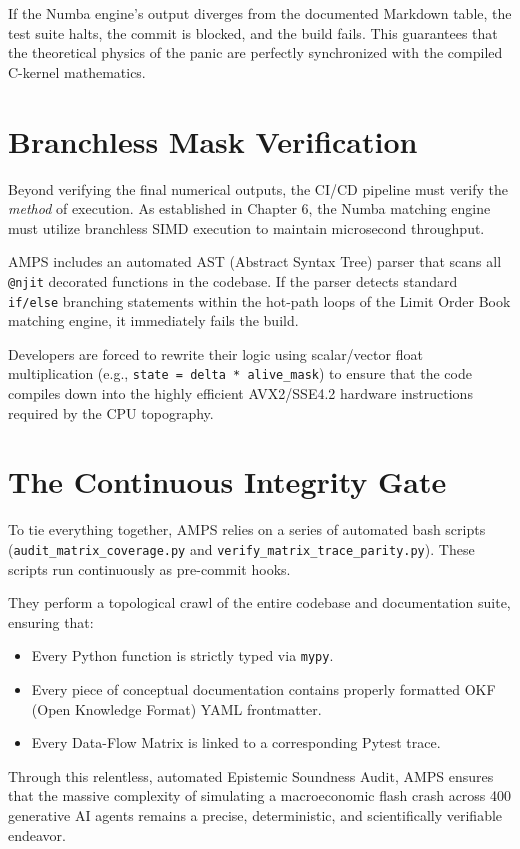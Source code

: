 If the Numba engine's output diverges from the documented Markdown table, the test suite halts, the commit is blocked, and the build fails. This guarantees that the theoretical physics of the panic are perfectly synchronized with the compiled C-kernel mathematics.

\section{Branchless Mask Verification}

Beyond verifying the final numerical outputs, the CI/CD pipeline must verify the \textit{method} of execution. As established in Chapter 6, the Numba matching engine must utilize branchless SIMD execution to maintain microsecond throughput.

AMPS includes an automated AST (Abstract Syntax Tree) parser that scans all \texttt{@njit} decorated functions in the codebase. If the parser detects standard \texttt{if/else} branching statements within the hot-path loops of the Limit Order Book matching engine, it immediately fails the build. 

Developers are forced to rewrite their logic using scalar/vector float multiplication (e.g., \texttt{state = delta * alive\_mask}) to ensure that the code compiles down into the highly efficient AVX2/SSE4.2 hardware instructions required by the CPU topography.

\section{The Continuous Integrity Gate}

To tie everything together, AMPS relies on a series of automated bash scripts (\texttt{audit\_matrix\_coverage.py} and \texttt{verify\_matrix\_trace\_parity.py}). These scripts run continuously as pre-commit hooks.

They perform a topological crawl of the entire codebase and documentation suite, ensuring that:
\begin{itemize}
    \item Every Python function is strictly typed via \texttt{mypy}.
    \item Every piece of conceptual documentation contains properly formatted OKF (Open Knowledge Format) YAML frontmatter.
    \item Every Data-Flow Matrix is linked to a corresponding Pytest trace.
\end{itemize}

Through this relentless, automated Epistemic Soundness Audit, AMPS ensures that the massive complexity of simulating a macroeconomic flash crash across 400 generative AI agents remains a precise, deterministic, and scientifically verifiable endeavor.
